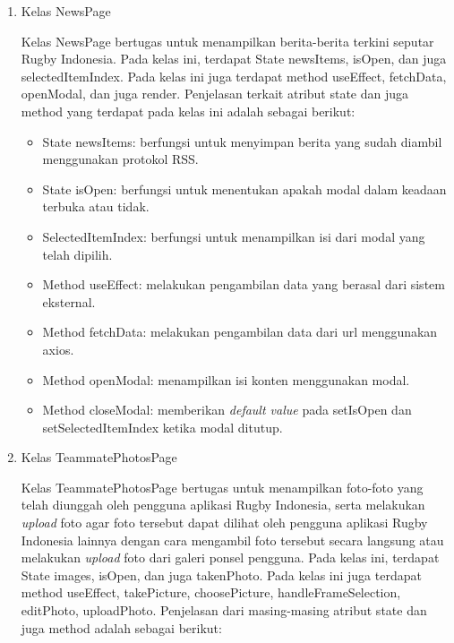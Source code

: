 \begin{enumerate}
    \item Kelas NewsPage

    Kelas NewsPage bertugas untuk menampilkan berita-berita terkini seputar Rugby Indonesia. Pada kelas ini, terdapat State newsItems, isOpen, dan juga selectedItemIndex. Pada kelas ini juga terdapat method useEffect, fetchData, openModal, dan juga render. Penjelasan terkait atribut state dan juga method yang terdapat pada kelas ini adalah sebagai berikut:

    \begin{itemize}
        \item State newsItems: berfungsi untuk menyimpan berita yang sudah diambil menggunakan protokol RSS.
        \item State isOpen: berfungsi untuk menentukan apakah modal dalam keadaan terbuka atau tidak.
        \item SelectedItemIndex: berfungsi untuk menampilkan isi dari modal yang telah dipilih.
        \item Method useEffect: melakukan pengambilan data yang berasal dari sistem eksternal.
        \item Method fetchData: melakukan pengambilan data dari url menggunakan axios.
        \item Method openModal: menampilkan isi konten menggunakan modal.
        \item Method closeModal: memberikan \textit{default value} pada setIsOpen dan setSelectedItemIndex ketika modal ditutup.
    \end{itemize}

    \item Kelas TeammatePhotosPage

    Kelas TeammatePhotosPage bertugas untuk menampilkan foto-foto yang telah diunggah oleh pengguna aplikasi Rugby Indonesia, serta melakukan \textit{upload} foto agar foto tersebut dapat dilihat oleh pengguna aplikasi Rugby Indonesia lainnya dengan cara mengambil foto tersebut secara langsung atau melakukan \textit{upload} foto dari galeri ponsel pengguna. Pada kelas ini, terdapat State images, isOpen, dan juga takenPhoto. Pada kelas ini juga terdapat method useEffect, takePicture, choosePicture, handleFrameSelection, editPhoto, uploadPhoto. Penjelasan dari masing-masing atribut state dan juga method adalah sebagai berikut:


\end{enumerate}

